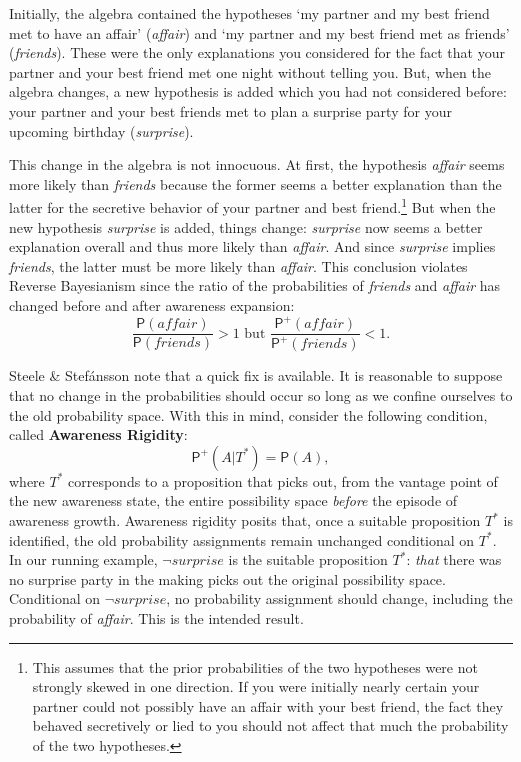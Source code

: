 \documentclass[
  11pt,
  dvipsnames,enabledeprecatedfontcommands]{scrartcl}
\newcommand{\pr}[1]{\ensuremath{\mathsf{P}(#1)}}
\newcommand{\ppr}[2]{\ensuremath{\mathsf{P}^{#1}(#2)}}
\begin{document}
\doublespace

\noindent Initially, the algebra contained the hypotheses `my partner
and my best friend met to have an affair' (\textit{affair}) and `my
partner and my best friend met as friends' (\textit{friends}). These
were the only explanations you considered for the fact that your partner
and your best friend met one night without telling you. But, when the
algebra changes, a new hypothesis is added which you had not considered
before: your partner and your best friends met to plan a surprise party
for your upcoming birthday (\textit{surprise}).

This change in the algebra is not innocuous. At first, the hypothesis
\textit{affair} seems more likely than \textit{friends} because the
former seems a better explanation than the latter for the secretive
behavior of your partner and best friend.\footnote{This assumes that the
  prior probabilities of the two hypotheses were not strongly skewed in
  one direction. If you were initially nearly certain your partner could
  not possibly have an affair with your best friend, the fact they
  behaved secretively or lied to you should not affect that much the
  probability of the two hypotheses.} But when the new hypothesis
\textit{surprise} is added, things change: \textit{surprise} now seems a
better explanation overall and thus more likely than \textit{affair}.
And since \textit{surprise} implies \textit{friends}, the latter must be
more likely than \textit{affair}. This conclusion violates Reverse
Bayesianism since the ratio of the probabilities of \textit{friends} and
\textit{affair} has changed before and after awareness expansion:
\[\frac{\pr{\textit{affair}}}{ \pr{\textit{friends}}}>1 \text{ but } \frac{\ppr{+}{\textit{affair}}}{ \ppr{+}{\textit{friends}}}<1.\]

Steele \& Stefánsson note that a quick fix is available. It is
reasonable to suppose that no change in the probabilities should occur
so long as we confine ourselves to the old probability space. With this
in mind, consider the following condition, called
\textbf{Awareness Rigidity}: \[\ppr{+}{A \vert T^*}=\pr{A},\] where
\(T^*\) corresponds to a proposition that picks out, from the vantage
point of the new awareness state, the entire possibility space
\emph{before} the episode of awareness growth. Awareness rigidity posits
that, once a suitable proposition \(T^*\) is identified, the old
probability assignments remain unchanged conditional on \(T^*\). In our
running example, \(\neg\textit{surprise}\) is the suitable proposition
\(T^*\): \emph{that} there was no surprise party in the making picks out
the original possibility space. Conditional on
\(\neg\textit{surprise}\), no probability assignment should change,
including the probability of \textit{affair}. This is the intended
result.
\end{document}

